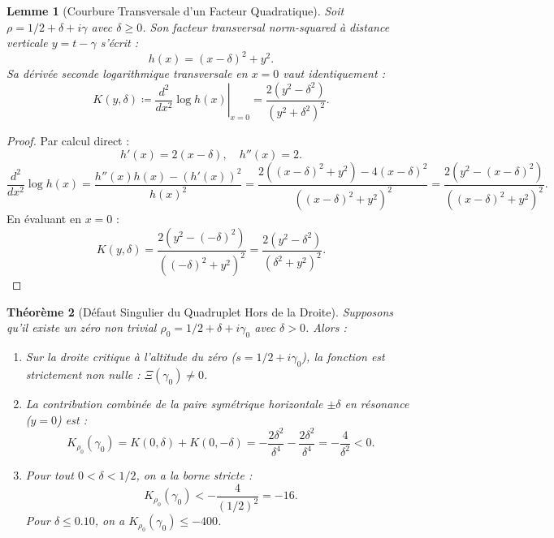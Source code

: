 \documentclass[11pt,a4paper]{article}
\newtheorem{theorem}{Théorème}[section]
\newtheorem{lemma}[theorem]{Lemme}
\theoremstyle{definition}
\theoremstyle{remark}
\begin{document}
\begin{lemma}[Courbure Transversale d'un Facteur Quadratique]
\label{lem:curvatura_factor_cuad}
Soit $\rho = 1/2 + \delta + i\gamma$ avec $\delta \ge 0$. Son facteur transversal norm-squared à distance verticale $y = t - \gamma$ s'écrit :
\begin{equation}
h(x) = (x - \delta)^2 + y^2.
\end{equation}
Sa dérivée seconde logarithmique transversale en $x = 0$ vaut identiquement :
\begin{equation}
K(y, \delta) \coloneqq \left.\frac{d^2}{dx^2}\log h(x)\right|_{x=0} = \frac{2(y^2 - \delta^2)}{(y^2 + \delta^2)^2}.
\end{equation}
\end{lemma}

\begin{proof}
Par calcul direct :
\[
h'(x) = 2(x - \delta), \quad h''(x) = 2.
\]
\[
\frac{d^2}{dx^2}\log h(x) = \frac{h''(x) h(x) - (h'(x))^2}{h(x)^2} = \frac{2((x - \delta)^2 + y^2) - 4(x - \delta)^2}{((x - \delta)^2 + y^2)^2} = \frac{2(y^2 - (x - \delta)^2)}{((x - \delta)^2 + y^2)^2}.
\]
En évaluant en $x = 0$ :
\[
K(y, \delta) = \frac{2(y^2 - (-\delta)^2)}{((-\delta)^2 + y^2)^2} = \frac{2(y^2 - \delta^2)}{(\delta^2 + y^2)^2}.
\]
\end{proof}

\begin{theorem}[Défaut Singulier du Quadruplet Hors de la Droite]
\label{thm:defecto_cuadruplete_experto}
Supposons qu'il existe un zéro non trivial $\rho_0 = 1/2 + \delta + i\gamma_0$ avec $\delta > 0$. Alors :
\begin{enumerate}
    \item Sur la droite critique à l'altitude du zéro ($s = 1/2 + i\gamma_0$), la fonction est strictement non nulle : $\Xi(\gamma_0) \neq 0$.
    \item La contribution combinée de la paire symétrique horizontale $\pm \delta$ en résonance ($y = 0$) est :
    \begin{equation}
    K_{\rho_0}(\gamma_0) = K(0, \delta) + K(0, -\delta) = -\frac{2\delta^2}{\delta^4} - \frac{2\delta^2}{\delta^4} = -\frac{4}{\delta^2} < 0.
    \end{equation}
    \item Pour tout $0 < \delta < 1/2$, on a la borne stricte :
    \begin{equation}
    K_{\rho_0}(\gamma_0) < -\frac{4}{(1/2)^2} = -16.
    \end{equation}
    Pour $\delta \le 0.10$, on a $K_{\rho_0}(\gamma_0) \le -400$.
\end{enumerate}
\end{theorem}
\end{document}
